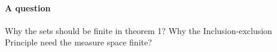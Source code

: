 \paragraph{A question} Why the sets should be finite in theorem 1? Why the Inclusion-exclusion Principle need the measure space finite?


